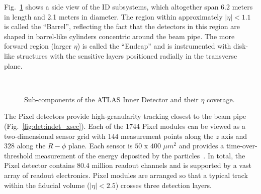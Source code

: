 Fig.~\ref{fig:det:indet_side} shows a side view of the ID subsystems, which altogether span 6.2 meters in length and 2.1 meters in diameter. The region within approximately $|\eta|<1.1$ is called the ``Barrel'', reflecting the fact that the detectors in this region are shaped in barrel-like cylinders concentric around the beam pipe. The more forward region (larger $\eta$) is called the ``Endcap'' and is instrumented with disk-like structures with the sensitive layers positioned radially in the transverse plane.

\begin{figure}[phtb]
  \begin{center}
          \\
 \caption{  Sub-components of the ATLAS Inner Detector and their $\eta$ coverage. }
 \label{fig:det:indet_side}
 \end{center}
\end{figure}

The Pixel detectors provide high-granularity tracking closest to the beam pipe (Fig.~\ref{fig:det:indet_xsec}). Each of the 1744 Pixel modules can be viewed as a two-dimensional sensor grid with $144$ measurement points along the $z$ axis and $328$ along the $R-\phi$ plane. Each sensor is $50$ x $400$ $\mu m^2$ and provides a time-over-threshold measurement of the energy deposited by the particles~\cite{1748-0221-3-07-P07007}. In total, the Pixel detector contains 80.4 million readout channels and is supported by a vast array of readout electronics. Pixel modules are arranged so that a typical track within the fiducial volume ($|\eta|<2.5$) crosses three detection layers.


